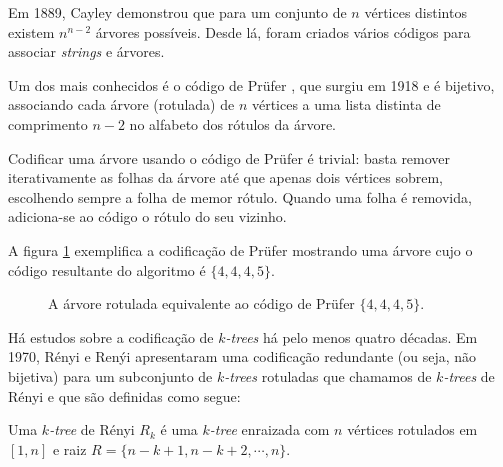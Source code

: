 Em 1889, Cayley \cite{cayley} demonstrou que para um conjunto de $n$ vértices distintos existem $n^{n-2}$ árvores possíveis. Desde lá, foram criados vários códigos para associar \emph{strings} e árvores.

Um dos mais conhecidos é o código de Prüfer \cite{prufer}, que surgiu em 1918 e é bijetivo, associando cada árvore (rotulada) de $n$ vértices a uma lista distinta de comprimento $n-2$ no alfabeto dos rótulos da árvore.

Codificar uma árvore usando o código de Prüfer é trivial: basta remover iterativamente as folhas da árvore até que apenas dois vértices sobrem, escolhendo sempre a folha de memor rótulo. Quando uma folha é removida, adiciona-se ao código o rótulo do seu vizinho.

A figura \ref{fig:prufer} exemplifica a codificação de Prüfer mostrando uma árvore cujo o código resultante do algoritmo é $\{4, 4, 4, 5\}$.

\begin{figure}
  \centering

  \caption{A árvore rotulada equivalente ao código de Prüfer $\{4, 4, 4, 5\}$.}
  \label{fig:prufer}
\end{figure}

\vspace{2em}

Há estudos sobre a codificação de \emph{$k$-trees} há pelo menos quatro décadas. Em 1970, Rényi e Renýi apresentaram uma codificação redundante (ou seja, não bijetiva) para um subconjunto de \emph{$k$-trees} rotuladas que chamamos de \emph{$k$-trees} de Rényi e que são definidas como segue:

\begin{definition}
  \cite{renyi} Uma \emph{$k$-tree} de Rényi $R_k$ é uma \emph{$k$-tree} enraizada com $n$ vértices rotulados em $[1, n]$ e raiz $R = \{n-k+1, n-k+2, \cdots, n\}$.
\end{definition}


